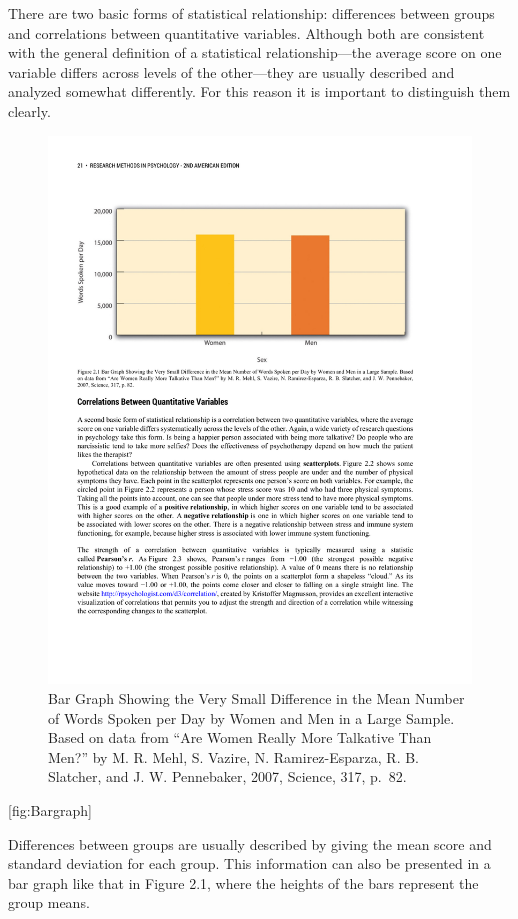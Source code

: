 \documentclass[]{book}
\theoremstyle{definition}
\theoremstyle{definition}
\theoremstyle{remark}
\begin{document}
There are two basic forms of statistical relationship: differences
between groups and correlations between quantitative variables. Although
both are consistent with the general definition of a statistical
relationship---the average score on one variable differs across levels
of the other---they are usually described and analyzed somewhat
differently. For this reason it is important to distinguish them
clearly.

\begin{figure}[htbp]
\centering
\includegraphics{figures/C2F2_barchart.pdf}
\caption{Bar Graph Showing the Very Small Difference in the Mean Number
of Words Spoken per Day by Women and Men in a Large Sample. Based on
data from ``Are Women Really More Talkative Than Men?'' by M. R. Mehl,
S. Vazire, N. Ramirez-Esparza, R. B. Slatcher, and J. W. Pennebaker,
2007, Science, 317, p.~82.}
\end{figure}

{[}fig:Bargraph{]}

Differences between groups are usually described by giving the mean
score and standard deviation for each group. This information can also
be presented in a bar graph like that in Figure 2.1, where the heights
of the bars represent the group means.
\end{document}
